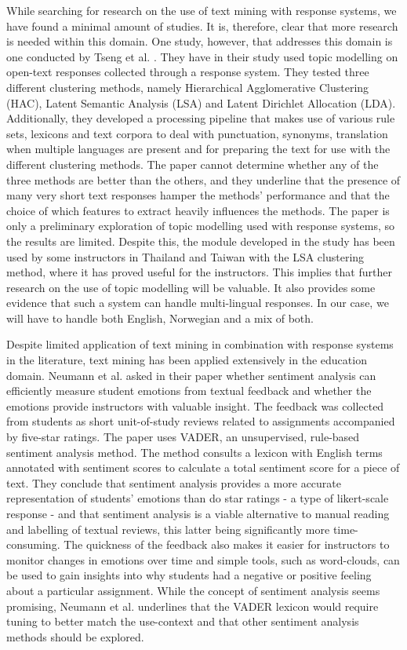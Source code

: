 While searching for research on the use of text mining with response systems, we have found a minimal amount of studies. It is, therefore, clear that more research is needed within this domain. One study, however, that addresses this domain is one conducted by Tseng et al. \cite{tseng2018}. They have in their study used topic modelling on open-text responses collected through a response system. They tested three different clustering methods, namely Hierarchical Agglomerative Clustering (HAC), Latent Semantic Analysis (LSA) and Latent Dirichlet Allocation (LDA). Additionally, they developed a processing pipeline that makes use of various rule sets, lexicons and text corpora to deal with punctuation, synonyms, translation when multiple languages are present and for preparing the text for use with the different clustering methods. The paper cannot determine whether any of the three methods are better than the others, and they underline that the presence of many very short text responses hamper the methods' performance and that the choice of which features to extract heavily influences the methods. The paper is only a preliminary exploration of topic modelling used with response systems, so the results are limited. Despite this, the module developed in the study has been used by some instructors in Thailand and Taiwan with the LSA clustering method, where it has proved useful for the instructors. This implies that further research on the use of topic modelling will be valuable. It also provides some evidence that such a system can handle multi-lingual responses. In our case, we will have to handle both English, Norwegian and a mix of both.

Despite limited application of text mining in combination with response systems in the literature, text mining has been applied extensively in the education domain. Neumann et al. \cite{neumann2021} asked in their paper whether sentiment analysis can efficiently measure student emotions from textual feedback and whether the emotions provide instructors with valuable insight. The feedback was collected from students as short unit-of-study reviews related to assignments accompanied by five-star ratings. The paper uses VADER, an unsupervised, rule-based sentiment analysis method. The method consults a lexicon with English terms annotated with sentiment scores to calculate a total sentiment score for a piece of text. They conclude that sentiment analysis provides a more accurate representation of students' emotions than do star ratings - a type of likert-scale response - and that sentiment analysis is a viable alternative to manual reading and labelling of textual reviews, this latter being significantly more time-consuming. The quickness of the feedback also makes it easier for instructors to monitor changes in emotions over time and simple tools, such as word-clouds, can be used to gain insights into why students had a negative or positive feeling about a particular assignment. While the concept of sentiment analysis seems promising, Neumann et al. underlines that the VADER lexicon would require tuning to better match the use-context and that other sentiment analysis methods should be explored.

